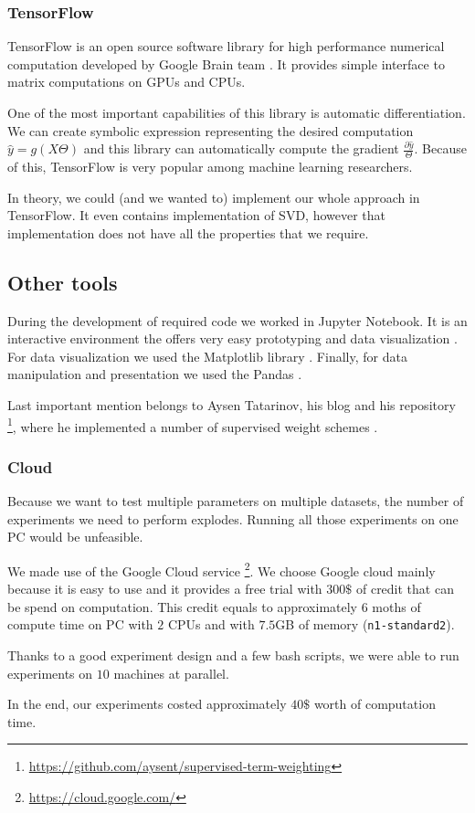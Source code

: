     \subsubsection{TensorFlow}
    
    TensorFlow is an open source software library for high performance numerical computation developed by Google Brain team \cite{tensorflow2015-whitepaper}. 
    It provides simple interface to matrix computations on GPUs and CPUs.
    
    One of the most important capabilities of this library is automatic differentiation.
    We can create symbolic expression representing the desired computation $\hat{y}=g(X\Theta)$ and this library can automatically compute the gradient $\frac{\partial \hat{y}}{\Theta}$.
    Because of this, TensorFlow is very popular among  machine learning researchers.
    
    In theory, we could (and we wanted to) implement our whole approach in TensorFlow.
    It even contains implementation of SVD, however that implementation does not have all the properties that we require.
    
    \subsection{Other tools}
    
    During the development of required code we worked in Jupyter Notebook. 
    It is an interactive environment the offers very easy prototyping and
    data visualization \cite{PER-GRA:2007}. %
    For data visualization we used the Matplotlib library \cite{hunter2007matplotlib}. %
    Finally, for data manipulation and presentation we used the Pandas \cite{mckinney2010data}. %
    
    Last important mention belongs to Aysen Tatarinov, his blog and his repository \footnote{\url{https://github.com/aysent/supervised-term-weighting}}, where he implemented a number of supervised weight schemes \cite{maas2011learning}.
    \* %
    
    
    \subsubsection{Cloud} 
    Because we want to test multiple parameters on multiple datasets, the number of experiments we need to perform explodes.
    Running all those experiments on one PC would be unfeasible.
    
    We made use of the Google Cloud service \footnote{\url{https://cloud.google.com/}}.
    We choose Google cloud mainly because it is easy to use and it provides a free trial with $300\$$ of credit that can be spend on computation. 
    This credit equals to approximately $6$ moths of compute time on PC with $2$ CPUs and with $7.5$GB of memory (\texttt{n1-standard2}).
    
    Thanks to a good experiment design and a few bash scripts,
    we were able to run experiments on $10$ machines at parallel.
    
    
    In the end, our experiments costed approximately $40\$$ worth of computation time.
    